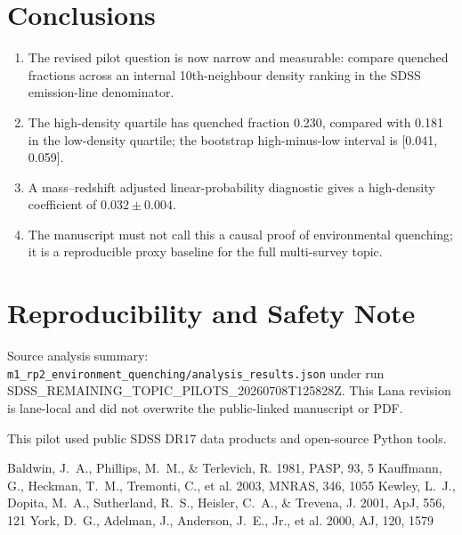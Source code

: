 \documentclass[twocolumn]{aastex631}
\begin{document}
\section{Conclusions}\label{sec:conclusions}
\begin{enumerate}
\item The revised pilot question is now narrow and measurable: compare quenched fractions across an internal 10th-neighbour density ranking in the SDSS emission-line denominator.
\item The high-density quartile has quenched fraction 0.230, compared with 0.181 in the low-density quartile; the bootstrap high-minus-low interval is [0.041, 0.059].
\item A mass--redshift adjusted linear-probability diagnostic gives a high-density coefficient of $0.032\pm0.004$.
\item The manuscript must not call this a causal proof of environmental quenching; it is a reproducible proxy baseline for the full multi-survey topic.
\end{enumerate}

\section*{Reproducibility and Safety Note}
Source analysis summary: \texttt{m1\_rp2\_environment\_quenching/analysis\_results.json} under run SDSS\_REMAINING\_TOPIC\_PILOTS\_20260708T125828Z.  This Lana revision is lane-local and did not overwrite the public-linked manuscript or PDF.

\acknowledgments
This pilot used public SDSS DR17 data products and open-source Python tools.

\begin{thebibliography}{}
 Baldwin, J.~A., Phillips, M.~M., \& Terlevich, R. 1981, PASP, 93, 5
 Kauffmann, G., Heckman, T.~M., Tremonti, C., et al. 2003, MNRAS, 346, 1055
 Kewley, L.~J., Dopita, M.~A., Sutherland, R.~S., Heisler, C.~A., \& Trevena, J. 2001, ApJ, 556, 121
 York, D.~G., Adelman, J., Anderson, J.~E., Jr., et al. 2000, AJ, 120, 1579
\end{thebibliography}
\end{document}
